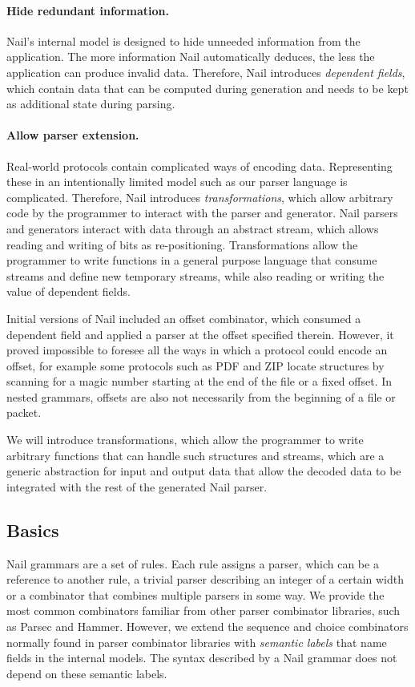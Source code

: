 \paragraph{Hide redundant information.}
Nail's internal model is designed to hide unneeded information from the application. The more
information Nail automatically deduces, the less the application can produce invalid data.
Therefore, Nail introduces \emph{dependent fields}, which contain data that can be computed during
generation and needs to be kept as additional state during parsing. 

\paragraph{Allow parser extension.}
Real-world protocols contain complicated ways of encoding data. Representing these in an
intentionally limited model such as our parser language is complicated. Therefore, Nail introduces
\emph{transformations}, which allow arbitrary code by the programmer to interact with the parser and
generator. Nail parsers and generators interact with data through an abstract stream, which allows
reading and writing of bits as re-positioning. Transformations allow the programmer to write
functions in a general purpose language that consume streams and define new temporary streams, while
also reading or writing the value of dependent fields.

Initial versions of Nail included an offset combinator, which consumed a dependent field and applied
a parser at the offset specified therein. However, it proved impossible to foresee all the ways in which a protocol could encode an offset, for example
some protocols such as PDF and ZIP locate structures by scanning for a magic number starting at the
end of the file or a fixed offset. In nested grammars, offsets are also not necessarily from
the beginning of a file or packet.

We will introduce transformations, which allow the programmer to write arbitrary functions that can
handle such structures and streams, which are a generic abstraction for input and output data that
allow the decoded data to be integrated with the rest of the generated Nail parser.

\subsection{Basics}
Nail grammars are a set of rules. Each rule assigns a parser, which can be a reference to another
rule, a trivial parser describing an integer of a certain width or a combinator that combines
multiple parsers in some way. We provide the most common combinators familiar from other parser
combinator libraries, such as Parsec\cite{LeijenMeijer:parsec} and Hammer\cite{hammer-parser}.
However, we extend the sequence and choice combinators normally found in parser combinator libraries
with \emph{semantic labels} that name fields in the internal models. The syntax described by a Nail
grammar does not depend on these semantic labels.

